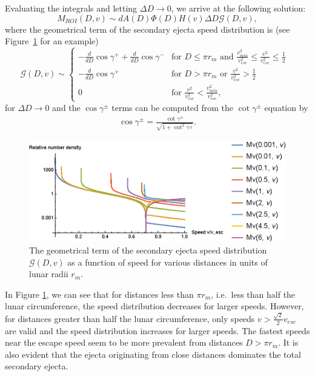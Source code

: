 \documentclass{hitec}
\numberwithin{equation}{section}
\begin{document}
Evaluating the integrals and letting $\Delta D \to 0$, we arrive at the following solution:
\begin{equation}\label{eq:M_ROI_D-v}
M_{ROI}(D,v) \sim dA(D)\Phi(D)H(v)\Delta D \mathcal{G}(D,v),
\end{equation}
where the geometrical term of the secondary ejecta speed distribution is (see Figure~\ref{fig:speed_dist} for an example)
\begin{equation}
\mathcal{G}(D,v) \sim
\begin{cases}
-\frac{d}{dD}\cos\gamma^+ + \frac{d}{dD}\cos\gamma^- &\text{for $D \le \pi r_m$ and $\frac{v_{min}^2}{v_{esc}^2} \le \frac{v^2}{v_{esc}^2} \le \frac{1}{2}$ }\\
-\frac{d}{dD}\cos\gamma^+ & \text{for $D > \pi r_m $ or $\frac{v^2}{v_{esc}^2} > \frac{1}{2}$}\\
0 & \text{for $\frac{v^2}{v_{esc}^2} < \frac{v_{min}^2}{v_{esc}^2}$},
\end{cases}
\end{equation}
for $\Delta D\to 0$ and the $\cos\gamma^\pm$ terms can be computed from the $\cot\gamma^\pm$ equation by
\begin{eqnarray}
\cos\gamma^\pm = \frac{\cot\gamma^\pm}{\sqrt{1 + \cot^2\gamma^\pm}}.
\end{eqnarray}

\begin{figure}[h!]
	\centering
	\includegraphics[width=1\textwidth]{speed_dist.eps}
	\caption{The geometrical term of the secondary ejecta speed distribution $\mathcal{G}(D,v)$ as a function of speed for various distances in units of lunar radii $r_m$.}\label{fig:speed_dist}
\end{figure}

In Figure \ref{fig:speed_dist}, we can see that for distances less than $\pi r_m$, i.e.\ less than half the lunar circumference, the speed distribution decreases for larger speeds. However, for distances greater than half the lunar circumference, only speeds $v > \frac{\sqrt{2}}{2}v_{esc}$ are valid and the speed distribution increases for larger speeds. The fastest speeds near the escape speed seem to be more prevalent from distances $D > \pi r_m$. It is also evident that the ejecta originating from close distances dominates the total secondary ejecta.
\end{document}
